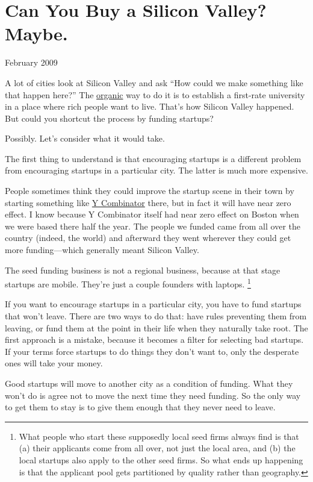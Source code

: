 \chapter{Can You Buy a Silicon Valley?  Maybe.}

February 2009

A lot of cities look at Silicon Valley and ask ``How could we make
something like that happen here?'' The
\href{siliconvalley.html}{organic} way to do it is to establish a
first-rate university in a place where rich people want to live. That's
how Silicon Valley happened. But could you shortcut the process by
funding startups?

Possibly. Let's consider what it would take.

The first thing to understand is that encouraging startups is a
different problem from encouraging startups in a particular city. The
latter is much more expensive.

People sometimes think they could improve the startup scene in their
town by starting something like \href{http://ycombinator.com}{Y
Combinator} there, but in fact it will have near zero effect. I know
because Y Combinator itself had near zero effect on Boston when we were
based there half the year. The people we funded came from all over the
country (indeed, the world) and afterward they went wherever they could
get more funding---which generally meant Silicon Valley.

The seed funding business is not a regional business, because at that
stage startups are mobile. They're just a couple founders with laptops.
\footnote{What people who start these supposedly local seed firms always
find is that (a) their applicants come from all over, not just the local
area, and (b) the local startups also apply to the other seed firms. So
what ends up happening is that the applicant pool gets partitioned by
quality rather than geography.}

If you want to encourage startups in a particular city, you have to fund
startups that won't leave. There are two ways to do that: have rules
preventing them from leaving, or fund them at the point in their life
when they naturally take root. The first approach is a mistake, because
it becomes a filter for selecting bad startups. If your terms force
startups to do things they don't want to, only the desperate ones will
take your money.

Good startups will move to another city as a condition of funding. What
they won't do is agree not to move the next time they need funding. So
the only way to get them to stay is to give them enough that they never
need to leave.

